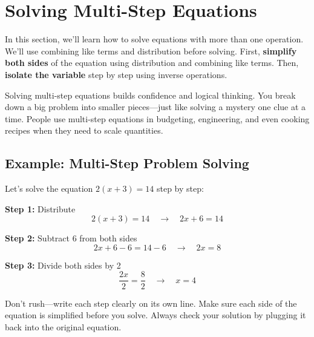 \cleardoublepage
\section{Solving Multi-Step Equations}

In this section, we'll learn how to solve equations with more than one operation. We'll use combining like terms and distribution before solving. First, \textbf{simplify both sides} of the equation using distribution and combining like terms. Then, \textbf{isolate the variable} step by step using inverse operations.

Solving multi-step equations builds confidence and logical thinking. You break down a big problem into smaller pieces—just like solving a mystery one clue at a time. People use multi-step equations in budgeting, engineering, and even cooking recipes when they need to scale quantities.

\subsection*{Example: Multi-Step Problem Solving}

Let's solve the equation $2(x + 3) = 14$ step by step:

\textbf{Step 1:} Distribute
\[
2(x + 3) = 14 \quad \rightarrow \quad 2x + 6 = 14
\]

\textbf{Step 2:} Subtract 6 from both sides
\[
2x + 6 - 6 = 14 - 6 \quad \rightarrow \quad 2x = 8
\]

\textbf{Step 3:} Divide both sides by 2
\[
\frac{2x}{2} = \frac{8}{2} \quad \rightarrow \quad x = 4
\]

Don't rush—write each step clearly on its own line. Make sure each side of the equation is simplified before you solve. Always check your solution by plugging it back into the original equation.



